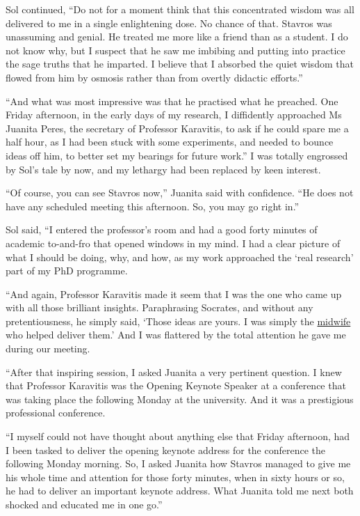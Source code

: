 \documentclass[
  a4paper,
]{article}
\begin{document}
Sol continued, ``Do not for a moment think that this concentrated wisdom
was all delivered to me in a single enlightening dose. No chance of
that. Stavros was unassuming and genial. He treated me more like a
friend than as a student. I do not know why, but I suspect that he saw
me imbibing and putting into practice the sage truths that he imparted.
I believe that I absorbed the quiet wisdom that flowed from him by
osmosis rather than from overtly didactic efforts.''

``And what was most impressive was that he practised what he preached.
One Friday afternoon, in the early days of my research, I diffidently
approached Ms Juanita Peres, the secretary of Professor Karavitis, to
ask if he could spare me a half hour, as I had been stuck with some
experiments, and needed to bounce ideas off him, to better set my
bearings for future work.'' I was totally engrossed by Sol's tale by
now, and my lethargy had been replaced by keen interest.

``Of course, you can see Stavros now,'' Juanita said with confidence.
``He does not have any scheduled meeting this afternoon. So, you may go
right in.''

Sol said, ``I entered the professor's room and had a good forty minutes
of academic to-and-fro that opened windows in my mind. I had a clear
picture of what I should be doing, why, and how, as my work approached
the `real research' part of my PhD programme.

``And again, Professor Karavitis made it seem that I was the one who
came up with all those brilliant insights. Paraphrasing Socrates, and
without any pretentiousness, he simply said, `Those ideas are yours. I
was simply the
\href{https://philosophycourse.info/lecsite/lec-socmidwife.html}{midwife}
who helped deliver them.' And I was flattered by the total attention he
gave me during our meeting.

``After that inspiring session, I asked Juanita a very pertinent
question. I knew that Professor Karavitis was the Opening Keynote
Speaker at a conference that was taking place the following Monday at
the university. And it was a prestigious professional conference.

``I myself could not have thought about anything else that Friday
afternoon, had I been tasked to deliver the opening keynote address for
the conference the following Monday morning. So, I asked Juanita how
Stavros managed to give me his whole time and attention for those forty
minutes, when in sixty hours or so, he had to deliver an important
keynote address. What Juanita told me next both shocked and educated me
in one go.''
\end{document}
